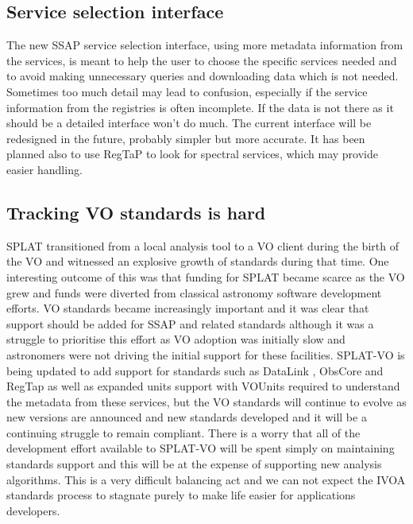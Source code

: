 \documentclass[final,authoryear,5p,times,twocolumn]{elsarticle}
\begin{document}
\subsection{Service selection interface}

The new SSAP service selection interface, using more metadata
information from the services, is meant to help the user to choose the
specific services needed and to avoid making unnecessary queries and
downloading data which is not needed. Sometimes too much detail may
lead to confusion, especially if the service information from the
registries is often incomplete. If the data is not there as it should
be a detailed interface won't do much. The current interface will be
redesigned in the future, probably simpler but more accurate. It has
been planned also to use RegTaP \citep{regtap} to look for spectral services, which
may provide easier handling.

\subsection{Tracking VO standards is hard}

SPLAT transitioned from a local analysis tool to a VO client during
the birth of the VO and witnessed an explosive growth of standards
during that time. One interesting outcome of this was that funding for
SPLAT became scarce as the VO grew and funds were diverted from
classical astronomy software development efforts. VO standards became
increasingly important and it was clear that support should be added
for SSAP and related standards although it was a struggle to
prioritise this effort as VO adoption was initially slow and
astronomers were not driving the initial support for these
facilities. SPLAT-VO is being updated to add support for standards
such as DataLink \citep{datalink}, ObsCore \citep{obstap} and RegTap \citep{regtap} as well as expanded units support with
VOUnits \citep{vounits} required to understand the metadata from these
services, but the VO standards will continue to evolve
as new versions are announced and new standards developed and it will
be a continuing struggle to remain compliant. There is a worry that
all of the development effort available to SPLAT-VO will be spent
simply on maintaining standards support and this will be at the
expense of supporting new analysis algorithms. This is a very
difficult balancing act and we can not expect the IVOA standards
process to stagnate purely to make life easier for applications
developers.
\end{document}
